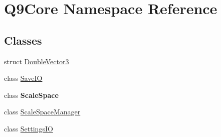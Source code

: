\hypertarget{namespace_q9_core}{}\section{Q9\+Core Namespace Reference}
\label{namespace_q9_core}
\subsection*{Classes}
\begin{DoxyCompactItemize}
\item 
struct \mbox{\hyperlink{struct_q9_core_1_1_double_vector3}{Double\+Vector3}}
\item 
class \mbox{\hyperlink{class_q9_core_1_1_save_i_o}{Save\+IO}}
\item 
class {\bfseries Scale\+Space}
\item 
class \mbox{\hyperlink{class_q9_core_1_1_scale_space_manager}{Scale\+Space\+Manager}}
\item 
class \mbox{\hyperlink{class_q9_core_1_1_settings_i_o}{Settings\+IO}}
\end{DoxyCompactItemize}
